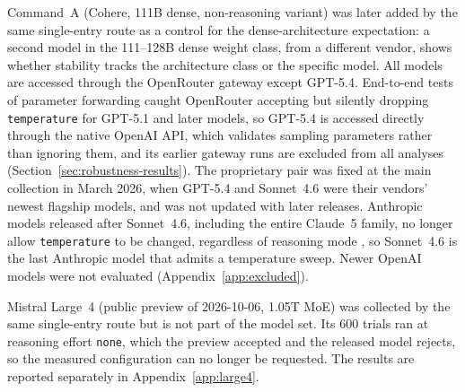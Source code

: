 Command~A (Cohere, 111B dense, non-reasoning variant) was later added by the same single-entry route as a control for the dense-architecture expectation: a second model in the 111--128B dense weight class, from a different vendor, shows whether stability tracks the architecture class or the specific model. All models are accessed through the OpenRouter gateway except GPT-5.4. End-to-end tests of parameter forwarding caught OpenRouter accepting but silently dropping \texttt{temperature} for GPT-5.1 and later models, so GPT-5.4 is accessed directly through the native OpenAI API, which validates sampling parameters rather than ignoring them, and its earlier gateway runs are excluded from all analyses (Section~\ref{sec:robustness-results}). The proprietary pair was fixed at the main collection in March 2026, when GPT-5.4 and Sonnet~4.6 were their vendors' newest flagship models, and was not updated with later releases. Anthropic models released after Sonnet~4.6, including the entire Claude~5 family, no longer allow \texttt{temperature} to be changed, regardless of reasoning mode \citep{anthropic2026sonnet5}, so Sonnet~4.6 is the last Anthropic model that admits a temperature sweep. Newer OpenAI models were not evaluated (Appendix~\ref{app:excluded}).

Mistral Large~4 (public preview of 2026-10-06, 1.05T MoE) was collected by the same single-entry route but is not part of the model set. Its 600 trials ran at reasoning effort \texttt{none}, which the preview accepted and the released model rejects, so the measured configuration can no longer be requested. The results are reported separately in Appendix~\ref{app:large4}.

